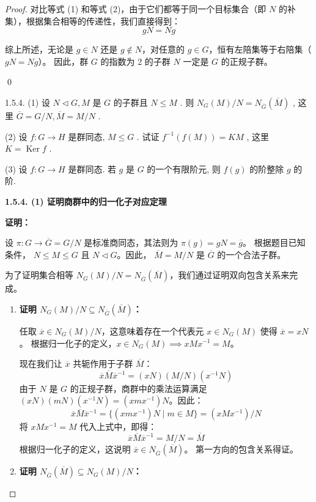 \documentclass[]{article}
\begin{document}
\begin{proof}
对比等式 (1) 和等式 (2)，由于它们都等于同一个目标集合（即 $N$ 的补集），根据集合相等的传递性，我们直接得到：
\[ gN = Ng \]

\bigskip
综上所述，无论是 $g \in N$ 还是 $g \notin N$，对任意的 $g \in G$，恒有左陪集等于右陪集（$gN = Ng$）。
因此，群 $G$ 的指数为 2 的子群 $N$ 一定是 $G$ 的正规子群。

\qed

1.5.4. (1) 设 $N \triangleleft G, M$ 是 $G$ 的子群且 $N \leqslant M$ . 则 $N_G(M)/N = N_{\overline{G}}(\overline{M})$ , 这里 $\overline{G} = G/N, \overline{M} = M/N$ . 

(2) 设 $f: G \longrightarrow H$ 是群同态, $M \leqslant G$ . 试证 $f^{-1}(f(M)) = KM$ , 这里 $K = \operatorname{Ker} f$ . 

(3) 设 $f: G \longrightarrow H$ 是群同态. 若 $g$ 是 $G$ 的一个有限阶元, 则 $f(g)$ 的阶整除 $g$ 的阶. 

\noindent \textbf{1.5.4. (1) 证明商群中的归一化子对应定理}

\medskip
\noindent \textbf{证明：}

设 $\pi: G \to \overline{G} = G/N$ 是标准商同态，其法则为 $\pi(g) = gN = \overline{g}$。
根据题目已知条件， $N \leqslant M \leqslant G$ 且 $N \triangleleft G$。因此， $\overline{M} = M/N$ 是 $\overline{G}$ 的一个合法子群。

为了证明集合相等 $N_G(M)/N = N_{\overline{G}}(\overline{M})$，我们通过证明双向包含关系来完成。

\begin{enumerate}
	\item \textbf{证明 $N_G(M)/N \subseteq N_{\overline{G}}(\overline{M})$：}
	
	任取 $\overline{x} \in N_G(M)/N$，这意味着存在一个代表元 $x \in N_G(M)$ 使得 $\overline{x} = xN$。
	根据归一化子的定义，$x \in N_G(M) \implies xMx^{-1} = M$。
	
	现在我们让 $\overline{x}$ 共轭作用于子群 $\overline{M}$：
	\[ \overline{x} \overline{M} \overline{x}^{-1} = (xN)(M/N)(x^{-1}N) \]
	由于 $N$ 是 $G$ 的正规子群，商群中的乘法运算满足 $(xN)(mN)(x^{-1}N) = (xmx^{-1})N$。因此：
	\[ \overline{x} \overline{M} \overline{x}^{-1} = \{ (xmx^{-1})N \mid m \in M \} = (xMx^{-1})/N \]
	将 $xMx^{-1} = M$ 代入上式中，即得：
	\[ \overline{x} \overline{M} \overline{x}^{-1} = M/N = \overline{M} \]
	根据归一化子的定义，这说明 $\overline{x} \in N_{\overline{G}}(\overline{M})$。
	第一方向的包含关系得证。
	
	\item \textbf{证明 $N_{\overline{G}}(\overline{M}) \subseteq N_G(M)/N$：}
	

\end{enumerate}
\end{proof}
\end{document}
